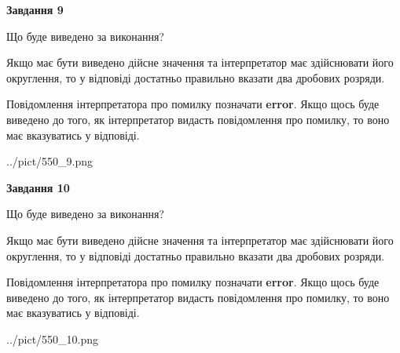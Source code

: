 \documentclass[12pt, ukrainian]{article}
\begin{document}
{\begin {Large}
{\begin {center}\textbf{Завдання 9}\end {center}}\par
Що буде виведено за виконання? \par

Якщо має бути виведено дійсне значення та інтерпретатор має здійснювати його округлення, 
то у відповіді достатньо правильно вказати два дробових розряди.

Повідомлення інтерпретатора про помилку позначати \textbf{error}.
Якщо щось буде виведено до того, як інтерпретатор видасть повідомлення про помилку, 
то воно має вказуватись у відповіді. \par

\begin{center}
	{../pict/550_9.png}
\end{center}
\newpage

{\begin {center}\textbf{Завдання 10}\end {center}}\par
Що буде виведено за виконання? \par

Якщо має бути виведено дійсне значення та інтерпретатор має здійснювати його округлення, 
то у відповіді достатньо правильно вказати два дробових розряди.

Повідомлення інтерпретатора про помилку позначати \textbf{error}.
Якщо щось буде виведено до того, як інтерпретатор видасть повідомлення про помилку, 
то воно має вказуватись у відповіді. \par

\begin{center}
	{../pict/550_10.png}
\end{center}
\newpage

\end {Large}}
\end{document}
